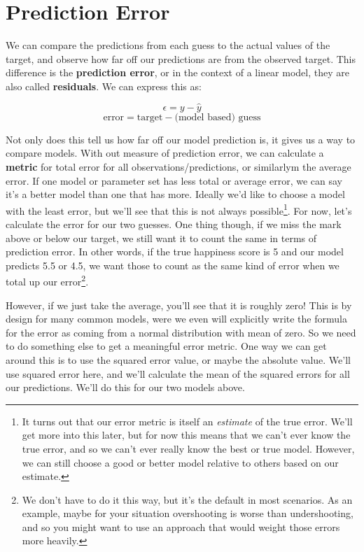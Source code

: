 \documentclass[
  letterpaper,
]{krantz}
\begin{document}
\section{Prediction Error}\label{sec-estim-prediction-error}

We can compare the predictions from each guess to the actual values of
the target, and observe how far off our predictions are from the
observed target. This difference is the \textbf{prediction error}, or in
the context of a linear model, they are also called \textbf{residuals}.
We can express this as:

\[
\epsilon = y - \hat{y}
\] \[ 
\textrm{error} = \textrm{target} - \textrm{(model based) guess}
\]

Not only does this tell us how far off our model prediction is, it gives
us a way to compare models. With out measure of prediction error, we can
calculate a \textbf{metric} for total error for all
observations/predictions, or similarlym the average error. If one model
or parameter set has less total or average error, we can say it's a
better model than one that has more. Ideally we'd like to choose a model
with the least error, but we'll see that this is not always
possible\footnote{It turns out that our error metric is itself an
  \emph{estimate} of the true error. We'll get more into this later, but
  for now this means that we can't ever know the true error, and so we
  can't ever really know the best or true model. However, we can still
  choose a good or better model relative to others based on our
  estimate.}. For now, let's calculate the error for our two guesses.
One thing though, if we miss the mark above or below our target, we
still want it to count the same in terms of prediction error. In other
words, if the true happiness score is 5 and our model predicts 5.5 or
4.5, we want those to count as the same kind of error when we total up
our error\footnote{We don't have to do it this way, but it's the default
  in most scenarios. As an example, maybe for your situation
  overshooting is worse than undershooting, and so you might want to use
  an approach that would weight those errors more heavily.}.

However, if we just take the average, you'll see that it is roughly
zero! This is by design for many common models, were we even will
explicitly write the formula for the error as coming from a normal
distribution with mean of zero. So we need to do something else to get a
meaningful error metric. One way we can get around this is to use the
squared error value, or maybe the absolute value. We'll use squared
error here, and we'll calculate the mean of the squared errors for all
our predictions. We'll do this for our two models above.
\end{document}
